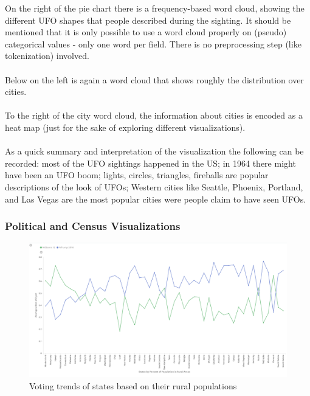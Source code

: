 \documentclass[bibliography=totoc]{article}
\begin{document}
On the right of the pie chart there is a frequency-based word cloud, showing the different UFO shapes that 
people described during the sighting. It should be mentioned that it is only possible to
use a word cloud properly on (pseudo) categorical values - only one word per field.
There is no preprocessing step
(like tokenization) involved.
\\
\\
Below on the left is again a word cloud that shows roughly the distribution over cities.
\\
\\
To the right of the city word cloud, the information about cities is encoded as a 
heat map (just for the sake of exploring different visualizations).
\\
\\
As a quick summary and interpretation of the visualization the following can 
be recorded: most of the UFO sightings happened in the US; in 1964 there might have been 
an UFO boom; lights, circles, triangles, fireballs are popular descriptions of the look of UFOs;
Western cities like Seattle, Phoenix, Portland, and Las Vegas are the most popular cities were people claim
to have seen UFOs.

\subsubsection{Political and Census Visualizations}
\begin{figure}
  \centering
  \includegraphics[width=\linewidth]{rural_voters_visualization.png}
 \caption{Voting trends of states based on their rural populations}
  \label{fig:rural_voter_trends}
\end{figure}
\end{document}
